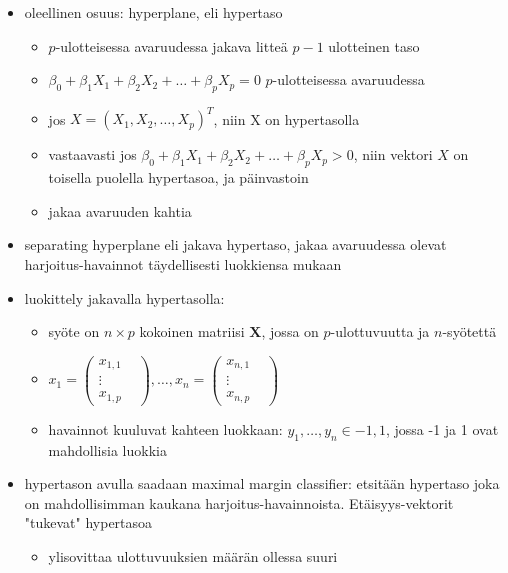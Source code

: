 \begin{itemize}
    \item oleellinen osuus: hyperplane, eli hypertaso
    \begin{itemize}
        \item $p$-ulotteisessa avaruudessa jakava litteä $p-1$ ulotteinen taso
        \item $\beta_0 + \beta_1 X_1 + \beta_2 X_2 + \dots + \beta_p X_p = 0$ $p$-ulotteisessa avaruudessa
        \item jos $X = (X_1, X_2, \dots , X_p)^T$, niin X on hypertasolla
        \item vastaavasti jos $\beta_0 + \beta_1 X_1 + \beta_2 X_2 + \dots + \beta_p X_p > 0$, niin vektori $X$ on toisella puolella hypertasoa, ja päinvastoin
        \item jakaa avaruuden kahtia
    \end{itemize}
    \item separating hyperplane eli jakava hypertaso, jakaa avaruudessa olevat harjoitus-havainnot täydellisesti luokkiensa mukaan
    \item luokittely jakavalla hypertasolla:
    \begin{itemize}
        \item syöte on $n \times p$ kokoinen matriisi $\textbf{X}$, jossa on $p$-ulottuvuutta ja $n$-syötettä
        \item $x_1 = \begin{pmatrix}
            x_{1,1} & \\ 
            \vdots & \\ 
            x_{1,p}
        \end{pmatrix}, \dots , x_n = \begin{pmatrix}
            x_{n,1} &\\
            \vdots & \\
            x_{n,p}
        \end{pmatrix}$
        \item havainnot kuuluvat kahteen luokkaan: $y_1, \dots, y_n \in {-1, 1}$, jossa -1 ja 1 ovat mahdollisia luokkia
    \end{itemize}
    \item hypertason avulla saadaan maximal margin classifier: etsitään hypertaso joka on mahdollisimman kaukana harjoitus-havainnoista. Etäisyys-vektorit "tukevat" hypertasoa
    \begin{itemize}
        \item ylisovittaa ulottuvuuksien määrän ollessa suuri

\end{itemize}
\end{itemize}
